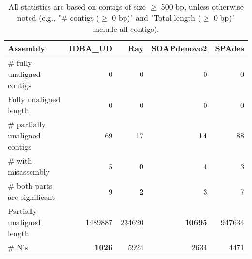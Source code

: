 \documentclass[12pt,a4paper]{article}
\begin{document}
\begin{table}[ht]
\begin{center}
\caption{All statistics are based on contigs of size $\geq$ 500 bp, unless otherwise noted (e.g., "\# contigs ($\geq$ 0 bp)" and "Total length ($\geq$ 0 bp)" include all contigs).}
\begin{tabular}{|l*{4}{|r}|}
\hline
Assembly & IDBA\_UD & Ray & SOAPdenovo2 & SPAdes \\ \hline
\# fully unaligned contigs & 0 & 0 & 0 & 0 \\ \hline
Fully unaligned length & 0 & 0 & 0 & 0 \\ \hline
\# partially unaligned contigs & 69 & 17 & {\bf 14} & 88 \\ \hline
\hspace{5mm}\# with misassembly & 5 & {\bf 0} & 4 & 3 \\ \hline
\hspace{5mm}\# both parts are significant & 9 & {\bf 2} & 3 & 7 \\ \hline
Partially unaligned length & 1489887 & 234620 & {\bf 10695} & 947634 \\ \hline
\# N's & {\bf 1026} & 5924 & 2634 & 4471 \\ \hline
\end{tabular}
\end{center}
\end{table}
\end{document}
